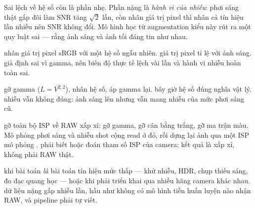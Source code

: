\documentclass[../../../deep_learning.tex]{subfiles}
\begin{document}
Sai lệch về hệ số còn là phần nhẹ. Phần nặng là \emph{hành vi của nhiễu}: phơi sáng thật gấp đôi làm SNR tăng \(\sqrt{2}\) lần, còn nhân giá trị pixel thì nhân cả tín hiệu lẫn nhiễu nên SNR không đổi. Mô hình học từ augmentation kiểu này rút ra một quy luật sai --- rằng ảnh sáng và ảnh tối đáng tin như nhau.

\begin{mach}
\item {} \gp nhân giá trị pixel sRGB với một hệ số ngẫu nhiên. \gd giá trị pixel tỉ lệ với ánh sáng. \gia giả định sai vì gamma, nên biên độ thực tế lệch vài lần và hành vi nhiễu hoàn toàn sai.
\item {} \gp gỡ gamma (\(L = V^{2{,}2}\)), nhân hệ số, áp gamma lại. \hq bây giờ hệ số đúng nghĩa vật lý. \vdm nhiễu vẫn không đúng: ảnh sáng lên nhưng vẫn mang nhiễu của mức phơi sáng cũ.
\item {} \gp gỡ toàn bộ ISP về RAW xấp xỉ: gỡ gamma, gỡ cân bằng trắng, gỡ ma trận màu. Mô phỏng phơi sáng và nhiễu shot cộng read ở đó, rồi dựng lại ảnh qua một ISP mô phỏng \cite{brooks2019unprocessing}. \gia phải biết hoặc đoán tham số ISP của camera; kết quả là xấp xỉ, không phải RAW thật.
\item {} \gp khi bài toán \emph{là} bài toán tín hiệu mức thấp --- khử nhiễu, HDR, chụp thiếu sáng, đo đạc quang học --- hoặc khi phải triển khai qua nhiều hãng camera khác nhau. \gia dữ liệu nặng gấp nhiều lần, hầu như không có mô hình tiền huấn luyện nào nhận RAW, và pipeline phải tự viết.
\end{mach}
\end{document}
